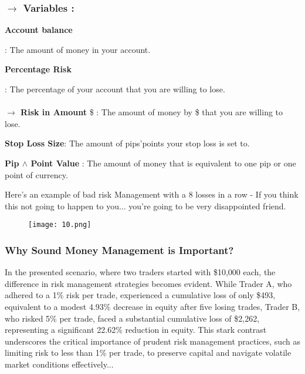 \documentclass[10pt]{article}
\begin{document}
\subsubsection*{$\rightarrow$ Variables :}
\vspace{0.1cm}
\begin{enumerate}
  \small{  \item \textbf{Account balance}} : The amount of money in your account.
\vspace{0.1cm}
  \small{  \item  \textbf{Percentage Risk}} : The percentage of your account that you are willing to lose. \\\\
\vspace{0.1cm}
    \small { \textbf{$\rightarrow$  Risk in Amount} \$ : The amount of money by \$ that you are willing to lose.}
\vspace{0.1cm}
  \small{  \item  \textbf{Stop Loss Size}: The amount of pips'points your stop loss is set to.}
\vspace{0.1cm}
  \small{  \item  \textbf{Pip $\wedge$ Point Value} : The amount of money that is equivalent to one pip or one point of currency.}
\end{enumerate}
\vspace{0.2cm}

\begin{violetbox}
\small Here's an example of bad risk Management with  a 8 losses in a row - If you think this not going to happen to you... you're going to be very disappointed friend.
\end{violetbox}


\begin{figure}[h]
\begin{center}
   \texttt{[image: 10.png]}
\end{center}
\end{figure}
\newpage

\subsubsection*{Why Sound Money Management is Important?}

\begin{notebox}
  \small{In the presented scenario, where two traders started with \$10,000 each, the difference in risk management strategies becomes evident. While Trader A, who adhered to a 1\% risk per trade, experienced a cumulative loss of only \$493, equivalent to a modest 4.93\% decrease in equity after five losing trades, Trader B, who risked 5\% per trade, faced a substantial cumulative loss of \$2,262, representing a significant 22.62\% reduction in equity. This stark contrast underscores the critical importance of prudent risk management practices, such as limiting risk to less than 1\% per trade, to preserve capital and navigate volatile market conditions effectively...}
\end{notebox}
\end{document}
